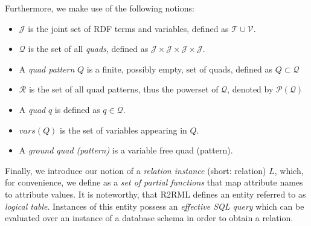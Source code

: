 Furthermore, we make use of the following notions:
\begin{itemize}
  \item $\mathcal{J}$ is the joint set of RDF terms and variables, defined as $\mathcal{T} \cup \mathcal{V}$.
  \item $\mathcal{Q}$ is the set of all \emph{quads}, defined as $\mathcal{J} \times \mathcal{J} \times \mathcal{J} \times \mathcal{J}$.
  \item A \emph{quad pattern} $Q$ is a finite, possibly empty, set of quads, defined as $Q
  \subset \mathcal{Q}$
  \item $\mathcal{R}$ is the set of all quad patterns, thus the powerset of $\mathcal{Q}$, denoted by $\mathcal{P}(\mathcal{Q})$
  \item A \emph{quad} $q$ is defined as $q \in \mathcal{Q}$.
  \item $vars(Q)$ is the set of variables appearing in $Q$.
  \item A \emph{ground quad (pattern)} is a variable free quad (pattern).
\end{itemize}

Finally, we introduce our notion of a \emph{relation instance} (short: relation) $L$, which, for convenience, we
define as a \emph{set of partial functions} that map attribute names to
attribute values.
It is noteworthy, that R2RML defines an entity referred to as \emph{logical
table}. Instances of this entity possess an
\emph{effective SQL
query} which can be evaluated over an instance
of a database schema in order to obtain a relation.




